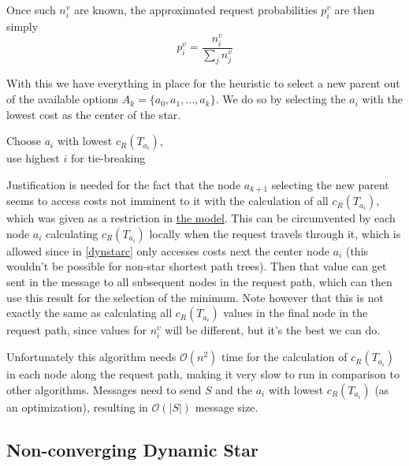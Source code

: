 \documentclass[a4paper, oneside]{discothesis}
\begin{document}
Once such $n_i^v$ are known, the approximated request probabilities $p_i^v$ are then simply
\begin{equation}
p_i^v=\frac{n_i^v}{\sum_jn_j^v}
\end{equation}

With this we have everything in place for the heuristic to select a new parent out of the available options $A_k=\{a_{0},a_{1},\dots,a_k\}$. We do so by selecting the $a_{i}$ with the lowest cost as the center of the star.

\begin{algorithmic}
\State\Return Choose $a_{i}$ with lowest $c_R(T_{a_{i}})$, \\\qquad use highest $i$ for tie-breaking
\EndFunction
\end{algorithmic}

Justification is needed for the fact that the node $a_{k+1}$ selecting the new parent seems to access costs not imminent to it with the calculation of all $c_R(T_{a_{i}})$, which was given as a restriction in \hyperref[model]{the model}. This can be circumvented by each node $a_{i}$ calculating $c_R(T_{a_{i}})$ locally when the request travels through it, which is allowed since in \autoref{dynstarc} only accesses costs next the center node $a_{i}$ (this wouldn't be possible for non-star shortest path trees). Then that value can get sent in the message to all subsequent nodes in the request path, which can then use this result for the selection of the minimum. Note however that this is not exactly the same as calculating all $c_R(T_{a_{i}})$ values in the final node in the request path, since values for $n_i^v$ will be different, but it's the best we can do.

Unfortunately this algorithm needs $\mathcal{O}(n^2)$ time for the calculation of $c_R(T_{a_i})$ in each node along the request path, making it very slow to run in comparison to other algorithms. Messages need to send $S$ and the $a_{i}$ with lowest $c_R(T_{a_{i}})$ (as an optimization), resulting in $\mathcal{O}(|S|)$ message size.

\subsection{Non-converging Dynamic Star}\label{alg:ncdynstar}
\end{document}

